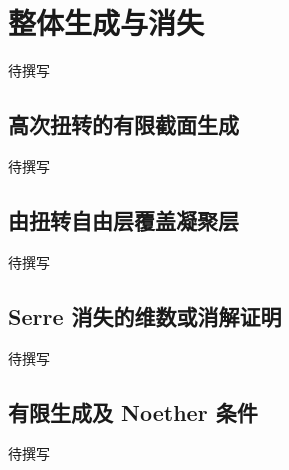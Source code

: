 
% 
% 

\section{整体生成与消失}
\label{g5:sec:1902}

待撰写

\subsection{高次扭转的有限截面生成}
\label{g5:subsec:1902:01}
待撰写

\subsection{由扭转自由层覆盖凝聚层}
\label{g5:subsec:1902:02}
待撰写

\subsection{Serre 消失的维数或消解证明}
\label{g5:subsec:1902:03}
待撰写

\subsection{有限生成及 Noether 条件}
\label{g5:subsec:1902:04}
待撰写

